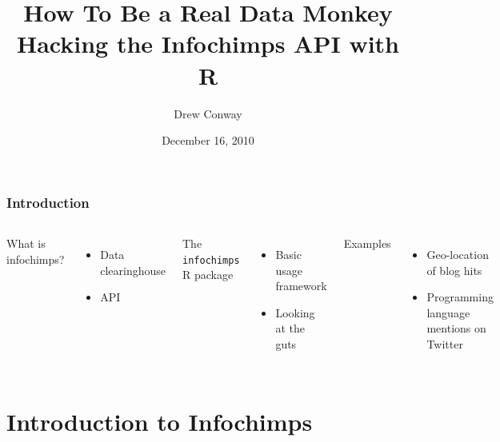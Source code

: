 \documentclass[xcolor=dvipsnames, 9pt]{beamer}
\title{How To Be a Real Data Monkey\\Hacking the Infochimps API with R}
\author{Drew Conway}
\date{December 16, 2010}
\begin{document}
 

\begin{frame}[plain]
  \titlepage  
\end{frame}

\begin{frame}
	\frametitle{Introduction}
	\begin{columns}
            What is infochimps?
            \begin{itemize}
                \item Data clearinghouse
                \item API
            \end{itemize}
            The \texttt{infochimps} R package
            \begin{itemize}
                \item Basic usage framework
                \item Looking at the guts
            \end{itemize}
            Examples
            \begin{itemize}
                \item Geo-location of blog hits
                \item Programming language mentions on Twitter
            \end{itemize}
            \includegraphics[width=5.5cm]{images/monkeys.jpg}
	\end{columns}
\end{frame}

\section{Introduction to Infochimps} %
\label{sec:introduction_to_infochimps}
\end{document}
